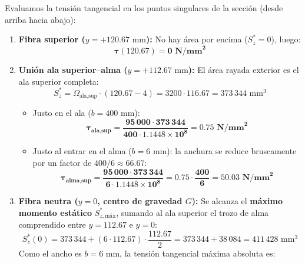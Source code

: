 {    Evaluamos la tensión tangencial en los puntos singulares de la sección (desde arriba hacia abajo):
    \begin{enumerate}
        \item \textbf{Fibra superior ($y = +120.67\text{ mm}$):} No hay área por encima ($S_z^* = 0$), luego:
              \begin{equation}
                  \mathbf{\tau(120.67) = 0\text{ N/mm}^2}
              \end{equation}
        \item \textbf{Unión ala superior--alma ($y = +112.67\text{ mm}$):}
              El área rayada exterior es el ala superior completa:
              \begin{equation}
                  S_z^* = \Omega_{\text{ala,sup}} \cdot (120.67 - 4) = 3200 \cdot 116.67 = 373\,344\text{ mm}^3
              \end{equation}
              \begin{itemize}
                  \item Justo en el ala ($b = 400\text{ mm}$):
                        \begin{equation}
                            \mathbf{\tau_{\text{ala,sup}} = \frac{95\,000 \cdot 373\,344}{400 \cdot 1.1448 \times 10^8} = \mathbf{0.75\text{ N/mm}^2}}
                        \end{equation}
                  \item Justo al entrar en el alma ($b = 6\text{ mm}$): la anchura se reduce bruscamente por un factor de $400/6 \approx 66.67$:
                        \begin{equation}
                            \mathbf{\tau_{\text{alma,sup}} = \frac{95\,000 \cdot 373\,344}{6 \cdot 1.1448 \times 10^8} = 0.75 \cdot \frac{400}{6} = \mathbf{50.03\text{ N/mm}^2}}
                        \end{equation}
              \end{itemize}
        \item \textbf{Fibra neutra ($y = 0$, centro de gravedad $G$):}
              Se alcanza el \textbf{máximo momento estático} $S_{z,\text{máx}}^*$, sumando al ala superior el trozo de alma comprendido entre $y = 112.67$ e $y = 0$:
              \begin{equation}
                  S_z^*(0) = 373\,344 + (6 \cdot 112.67) \cdot \frac{112.67}{2} = 373\,344 + 38\,084 = 411\,428\text{ mm}^3
              \end{equation}
              Como el ancho es $b = 6\text{ mm}$, la tensión tangencial máxima absoluta es:

\end{enumerate}}
